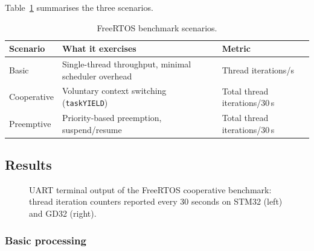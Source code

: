 Table~\ref{tab:gd32-freertos-scenarios} summarises the three scenarios.

\begin{table}[H]
  \centering
  \caption{FreeRTOS benchmark scenarios.}
  \label{tab:gd32-freertos-scenarios}
  \begin{tabularx}{\textwidth}{l X l}
    \toprule
    \textbf{Scenario} & \textbf{What it exercises} & \textbf{Metric} \\
    \midrule
    Basic        & Single-thread throughput, minimal scheduler overhead
                 & Thread iterations/s \\
    Cooperative  & Voluntary context switching (\texttt{taskYIELD})
                 & Total thread iterations/30\,s \\
    Preemptive   & Priority-based preemption, suspend/resume
                 & Total thread iterations/30\,s \\
    \bottomrule
  \end{tabularx}
\end{table}

\subsection{Results}
\label{sec:gd32-freertos-results}

\begin{figure}[H]
\centering
{}
\caption{UART terminal output of the FreeRTOS cooperative benchmark: thread iteration counters reported every 30 seconds on STM32 (left) and GD32 (right).}
\label{fig:gd32-freertos-uart}
\end{figure}

\subsubsection{Basic processing}
\label{sec:gd32-freertos-basic}

